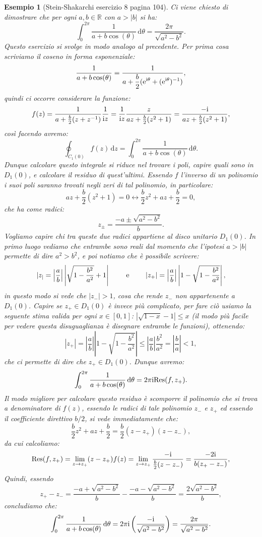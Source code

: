 \documentclass[11pt]{book}
\theoremstyle{Definizione}
\theoremstyle{TeoremaProposizioneLemmaCorollarioCongettura}
\theoremstyle{OsservazioneNotaEsempio}
\newtheorem{myes}{Esempio}[section]
\newcommand{\R}{\mathbb{R}}
\newcommand{\Disc}[3][]{D^{#1}_{{#2}}({#3})}
\renewcommand{\i}{\textup{i}}
\newcommand{\e}{\textup{e}}
\renewcommand{\d}{\mathrm{d}}
\newcommand{\dz}{\,\d z}
\newcommand{\dtheta}{\, \d \theta}
\newcommand{\Res}{\textup{Res}}
\begin{document}
\begin{myes}[Stein-Shakarchi esercizio 8 pagina 104]\label{es:SteinShakarchiEs8pag104}
Ci viene chiesto di dimostrare che per ogni $a,b\in \R$ con $a > |b|$ si ha:
$$
\int_{0}^{2\pi} \frac{1}{a+ b \cos(\theta)}\dtheta = \frac{2\pi }{\sqrt{a^2-b^2}}.
$$
Questo esercizio si svolge in modo analogo al precedente. Per prima cosa scriviamo il coseno in forma esponenziale:
$$
\frac{1}{a+b\cos(\theta)} = \frac{1}{\displaystyle{a+\frac{b}{2}(\e^{\i\theta}+(\e^{\i\theta})^{-1})}},
$$
quindi ci occorre considerare la funzione:
$$
f(z) = \frac{1}{a+\frac{b}{2}(z+z^{-1})}\frac{1}{\i z} = \frac{1}{\i z}\frac{z}{az+\frac{b}{2}(z^2+1)} =\frac{-\i}{az+\frac{b}{2}(z^2+1)},
$$
così facendo avremo:
$$
\oint_{C_1(0)} f(z)\dz = \int_{0}^{2\pi} \frac{1}{a+b \cos(\theta)}\dtheta.
$$
Dunque calcolare questo integrale si riduce nel trovare i poli, capire quali sono in $\Disc{1}{0}$, e calcolare il residuo di quest'ultimi. Essendo $f$ l'inverso di un polinomio i suoi poli saranno trovati negli zeri di tal polinomio, in particolare:
$$
az + \frac{b}{2}(z^2+1) = 0 \longleftrightarrow \frac{b}{2}z^2+az+\frac{b}{2} = 0,
$$
che ha come radici:
$$
z_{\pm} = \frac{-a\pm \sqrt{a^2-b^2}}{b}.
$$
Vogliamo capire chi tra queste due radici appartiene al disco unitario $\Disc{1}{0}$. In primo luogo vediamo che entrambe sono reali dal momento che l'ipotesi $a > |b|$ permette di dire $a^2 > b^2$, e poi notiamo che è possibile scrivere:
$$
|z_ |= \left|\frac{a}{b}\right|\left|\sqrt{1-\frac{b^2}{a^2}}+1\right| \qquad \textup{ e }\qquad |z_+| = \left|\frac{a}{b}\right|\left|1-\sqrt{1-\frac{b^2}{a^2}}\right|,
$$
in questo modo si vede che $|z_-| > 1$, cosa che rende $z_-$ non appartenente a $\Disc{1}{0}$. Capire se $z_+\in \Disc{1}{0}$ è invece più complicato, per fare ciò usiamo la seguente stima valida per ogni $x \in [0,1]$: $|\sqrt{1-x}-1|\leq x$ (il modo più facile per vedere questa disuguaglianza è disegnare entrambe le funzioni), ottenendo:
$$
|z_+| = \left|\frac{a}{b}\right|\left|1-\sqrt{1-\frac{b^2}{a^2}}\right|\leq \left|\frac{a}{b}\right|\frac{b^2}{a^2} = \left|\frac{b}{a}\right|< 1,
$$
che ci permette di dire che $z_+\in \Disc{1}{0}$. Dunque avremo:
$$
\int_{0}^{2\pi} \frac{1}{a+b\cos(\theta)}\dtheta = 2\pi \i \Res(f,z_+).
$$
Il modo migliore per calcolare questo residuo è scomporre il polinomio che si trova a denominatore di $f(z)$, essendo le radici di tale polinomio $z_-$ e $z_+$ ed essendo il coefficiente direttivo $b/2$, si vede immediatamente che:
$$
\frac{b}{2}z^2+az+\frac{b}{2} = \frac{b}{2}(z-z_+)(z-z_-),
$$
da cui calcoliamo:
$$
\Res(f,z_+) = \lim_{z \to z_+} (z-z_+) f(z) = \lim_{z \to z_+} \frac{-\i}{\frac{b}{2}(z-z_-)} = \frac{-2\i }{b(z_+-z_-)},
$$
Quindi, essendo
$$
z_+-z_- = \frac{-a+\sqrt{a^2-b^2}}{b}-\frac{-a-\sqrt{a^2-b^2}}{b} = \frac{2\sqrt{a^2-b^2}}{b},
$$
concludiamo che:
$$
\int_{0}^{2\pi } \frac{1}{a+b\cos(\theta)}\dtheta = 2\pi \i \left(\frac{-\i}{\sqrt{a^2-b^2}}\right) = \frac{2\pi}{\sqrt{a^2-b^2}}.
$$
\end{myes}
\end{document}
